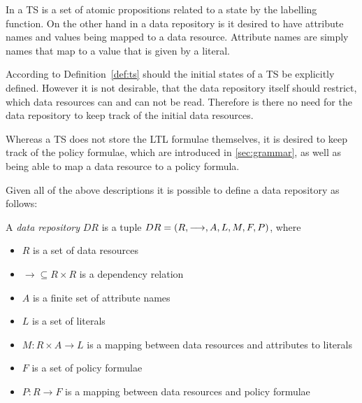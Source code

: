 In a TS is a set of atomic propositions related to a state by the labelling function. On the other hand in a data repository is it desired to have attribute names and values being mapped to a data resource. Attribute names are simply names that map to a value that is given by a literal.

According to Definition~\ref{def:ts} should the initial states of a TS be explicitly defined. However it is not desirable, that the data repository itself should restrict, which data resources can and can not be read. Therefore is there no need for the data repository to keep track of the initial data resources.

Whereas a TS does not store the LTL formulae themselves, it is desired to keep track of the policy formulae, which are introduced in \autoref{sec:grammar}, as well as being able to map a data resource to a policy formula.

Given all of the above descriptions it is possible to define a data repository as follows:
\begin{definition}
A \emph{data repository} $DR$ is a tuple $DR= \left( R, \longrightarrow, A, L, M, F, P \right)$, where
\begin{itemize}
  \item $R$ is a set of data resources
  \item $\longrightarrow \subseteq R \times R$ is a dependency relation
  \item $A$ is a finite set of attribute names
  \item $L$ is a set of literals
  \item $M : R \times A \rightarrow L$ is a mapping between data resources and attributes to literals
  \item $F$ is a set of policy formulae
  \item $P : R \rightarrow F$ is a mapping between data resources and policy formulae
\end{itemize}
\end{definition}

